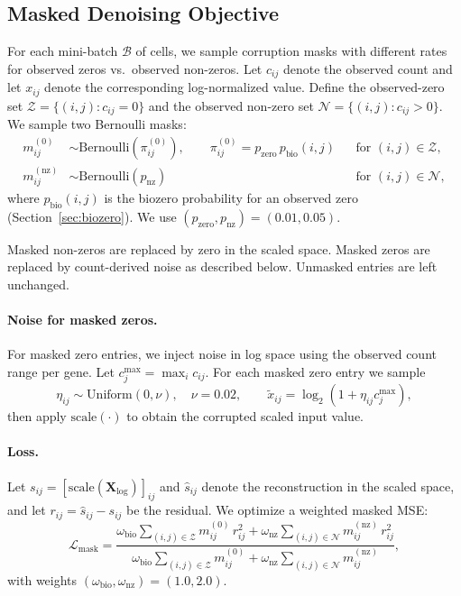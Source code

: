 \documentclass{article}
\theoremstyle{plain}
\theoremstyle{definition}
\theoremstyle{remark}
\begin{document}
\subsection{Masked Denoising Objective}
\label{sec:masking}
  For each mini-batch $\mathcal{B}$ of cells, we sample corruption masks with
  different rates for observed zeros vs.\ observed non-zeros. Let $c_{ij}$ denote
  the observed count and let $x_{ij}$ denote the corresponding log-normalized
  value. Define the observed-zero set $\mathcal{Z}=\{(i,j):c_{ij}=0\}$ and the
  observed non-zero set $\mathcal{N}=\{(i,j):c_{ij}>0\}$. We sample two Bernoulli
  masks:
  \[
  \begin{aligned}
  m^{(0)}_{ij} &\sim \mathrm{Bernoulli}(\pi^{(0)}_{ij}),\qquad
  \pi^{(0)}_{ij}=p_{\mathrm{zero}}\,p_{\mathrm{bio}}(i,j)
  &&\text{for }(i,j)\in\mathcal{Z},\\
  m^{(\mathrm{nz})}_{ij} &\sim \mathrm{Bernoulli}(p_{\mathrm{nz}})
  &&\text{for }(i,j)\in\mathcal{N},
  \end{aligned}
  \]
  where $p_{\mathrm{bio}}(i,j)$ is the biozero probability for an observed zero
  (Section~\ref{sec:biozero}). We use $(p_{\mathrm{zero}},p_{\mathrm{nz}})=(0.01,0.05)$.

  Masked non-zeros are replaced by zero in the scaled space. Masked zeros are
  replaced by count-derived noise as described below. Unmasked entries are left
  unchanged.

  \paragraph{Noise for masked zeros.}
  For masked zero entries, we inject noise in log space using the observed count
  range per gene. Let $c^{\max}_j=\max_i c_{ij}$. For each masked zero entry we
  sample
  \[
  \eta_{ij}\sim\mathrm{Uniform}(0,\nu),\quad \nu=0.02,\qquad
  \tilde{x}_{ij}=\log_2(1+\eta_{ij}c^{\max}_j),
  \]
  then apply $\mathrm{scale}(\cdot)$ to obtain the corrupted scaled input value.

\paragraph{Loss.}
  Let $s_{ij}=[\mathrm{scale}(\mathbf{X}_{\log})]_{ij}$ and
  $\hat{s}_{ij}$ denote the reconstruction in the scaled space, and let
  $r_{ij}=\hat{s}_{ij}-s_{ij}$ be the residual. We optimize a weighted masked MSE:
  \[
  \mathcal{L}_{\mathrm{mask}}=
  \frac{\omega_{\mathrm{bio}}\sum_{(i,j)\in\mathcal{Z}} m^{(0)}_{ij}\,r_{ij}^2
        +\omega_{\mathrm{nz}}\sum_{(i,j)\in\mathcal{N}} m^{(\mathrm{nz})}_{ij}\,r_{ij}^2}
       {\omega_{\mathrm{bio}}\sum_{(i,j)\in\mathcal{Z}} m^{(0)}_{ij}
        +\omega_{\mathrm{nz}}\sum_{(i,j)\in\mathcal{N}} m^{(\mathrm{nz})}_{ij}},
  \]
  with weights $(\omega_{\mathrm{bio}},\omega_{\mathrm{nz}})=(1.0,2.0)$.
\end{document}
